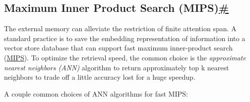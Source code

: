 \subsection{\texorpdfstring{Maximum Inner Product Search (MIPS)\hyperref[maximum-inner-product-search-mips]{\#}}{Maximum Inner Product Search (MIPS)\#}}\label{maximum-inner-product-search-mips}

The external memory can alleviate the restriction of finite attention span. A standard practice is to save the embedding representation of information into a vector store database that can support fast maximum inner-product search (\href{https://en.wikipedia.org/wiki/Maximum_inner-product_search}{MIPS}). To optimize the retrieval speed, the common choice is the \emph{approximate nearest neighbors (ANN)\hspace{0pt}} algorithm to return approximately top k nearest neighbors to trade off a little accuracy lost for a huge speedup.

A couple common choices of ANN algorithms for fast MIPS:

